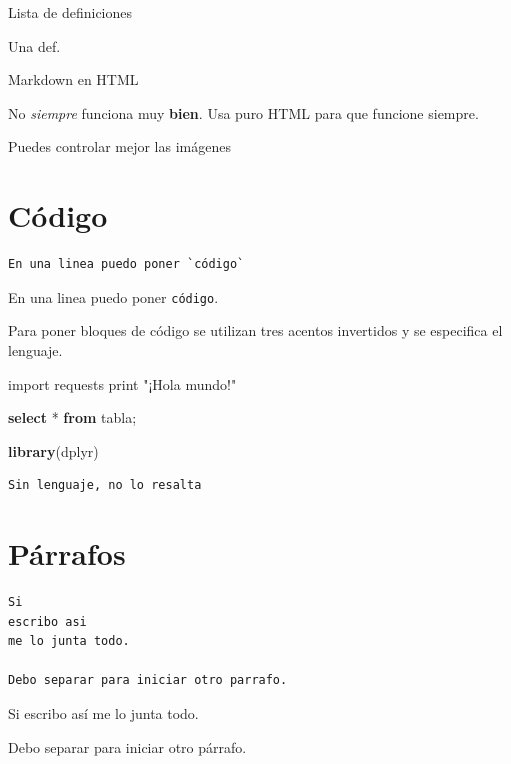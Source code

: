 \documentclass[]{article}
\newenvironment{Shaded}{\begin{snugshade}}{\end{snugshade}}
\newcommand{\KeywordTok}[1]{\textcolor[rgb]{0.13,0.29,0.53}{\textbf{#1}}}
\newcommand{\StringTok}[1]{\textcolor[rgb]{0.31,0.60,0.02}{#1}}
\newcommand{\ImportTok}[1]{#1}
\newcommand{\BuiltInTok}[1]{#1}
\newcommand{\NormalTok}[1]{#1}
\begin{document}
Lista de definiciones

Una def.

Markdown en HTML

No \emph{siempre} funciona muy \textbf{bien}. Usa puro HTML para que
funcione siempre.

Puedes controlar mejor las imágenes

\section{Código}\label{codigo}

\begin{verbatim}
En una linea puedo poner `código`
\end{verbatim}

En una linea puedo poner \texttt{código}.

Para poner bloques de código se utilizan tres acentos invertidos y se
especifica el lenguaje.

\begin{Shaded}
\begin{Highlighting}[]
\ImportTok{import}\NormalTok{ requests}
\BuiltInTok{print} \StringTok{"¡Hola mundo!"}
\end{Highlighting}
\end{Shaded}

\begin{Shaded}
\begin{Highlighting}[]
\KeywordTok{select}\NormalTok{ * }\KeywordTok{from}\NormalTok{ tabla;}
\end{Highlighting}
\end{Shaded}

\begin{Shaded}
\begin{Highlighting}[]
\KeywordTok{library}\NormalTok{(dplyr)}
\end{Highlighting}
\end{Shaded}

\begin{verbatim}
Sin lenguaje, no lo resalta
\end{verbatim}

\section{Párrafos}\label{parrafos}

\begin{verbatim}
Si
escribo asi
me lo junta todo.

Debo separar para iniciar otro parrafo.
\end{verbatim}

Si escribo así me lo junta todo.

Debo separar para iniciar otro párrafo.
\end{document}
